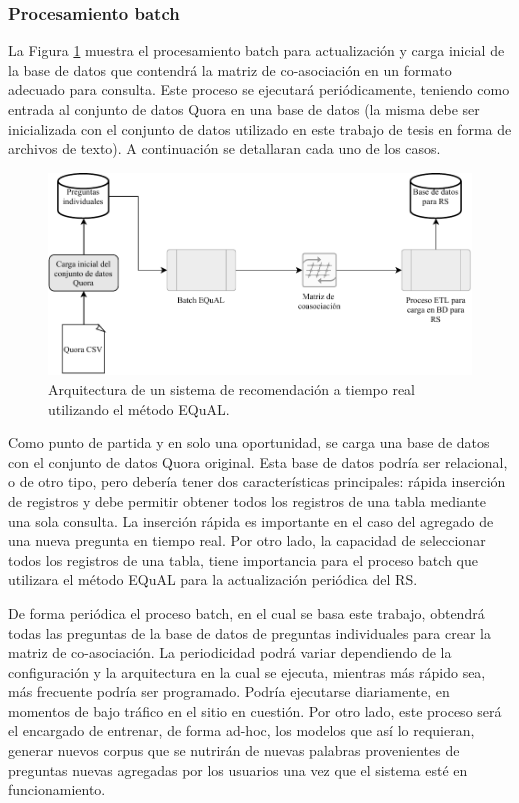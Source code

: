 \subsubsection{Procesamiento batch}
La Figura \ref{fig:implementacionrsbatch} muestra el procesamiento batch para actualización y carga inicial de la base de datos que contendrá la matriz de co-asociación en un formato adecuado para consulta. Este proceso se ejecutará periódicamente, teniendo como entrada al conjunto de datos Quora en una base de datos (la misma debe ser inicializada con el conjunto de datos utilizado en este trabajo de tesis en forma de archivos de texto). A continuación se detallaran cada uno de los casos.

\bigskip
\begin{figure}[h!]
	\centering
	\includegraphics[width=0.9\linewidth]{8_problema_investigacion/imagenes/implementacion_rs_batch}
	\caption{Arquitectura de un sistema de recomendación a tiempo real utilizando el método EQuAL.}
	\label{fig:implementacionrsbatch}
\end{figure}

Como punto de partida y en solo una oportunidad, se carga una base de datos con el conjunto de datos Quora original. Esta base de datos podría ser relacional, o de otro tipo, pero debería tener dos características principales: rápida inserción de registros y debe permitir obtener todos los registros de una tabla mediante una sola consulta. La inserción rápida es importante en el caso del agregado de una nueva pregunta en tiempo real. Por otro lado, la capacidad de seleccionar todos los registros de una tabla, tiene importancia para el proceso batch que utilizara el método EQuAL para la actualización periódica del RS.

\bigskip De forma periódica el proceso batch, en el cual se basa este trabajo, obtendrá todas las preguntas de la base de datos de preguntas individuales para crear la matriz de co-asociación. La periodicidad podrá variar dependiendo de la configuración y la arquitectura en la cual se ejecuta, mientras más rápido sea, más frecuente podría ser programado. Podría ejecutarse diariamente, en momentos de bajo tráfico en el sitio en cuestión. Por otro lado, este proceso será el encargado de entrenar, de forma ad-hoc, los modelos que así lo requieran, generar nuevos corpus que se nutrirán de nuevas palabras provenientes de preguntas nuevas agregadas por los usuarios una vez que el sistema esté en funcionamiento.

